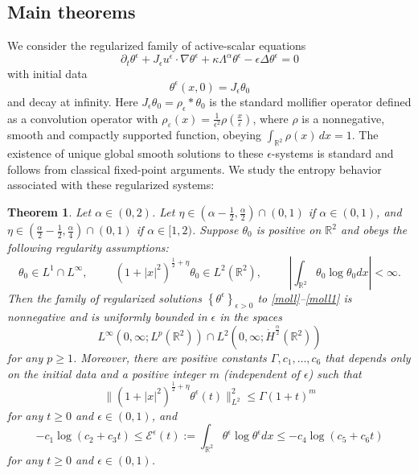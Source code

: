 \documentclass[12pt,reqno]{amsart}
\newcommand{\pa}{\partial}
\newcommand{\na}{\nabla}
\newcommand{\be}{\begin{equation}}
\newcommand{\ee}{\end{equation}}
\newtheorem{thm}{Theorem}[section]
\newcommand{\R}{\mathbb R}
\def\RR{{\mathbb R}}
\begin{document}
\subsection{Main theorems} We consider the regularized family of active-scalar equations 
\be \label{moll}
\pa_t \theta^{\epsilon} + J_{\epsilon}u^{\epsilon} \cdot \na \theta^{\epsilon} + \kappa \Lambda^{\alpha} \theta^{\epsilon} - \epsilon \Delta \theta^{\epsilon} = 0
\ee with initial data
\be \label{moll1}
\theta^{\epsilon}(x,0)  = J_{\epsilon} \theta_0
\ee and decay at infinity. Here $J_{\epsilon}\theta_0 = \rho_\epsilon * \theta_0$ is the standard mollifier operator defined as a convolution operator with $\rho_\varepsilon(x)
=
\frac{1}{\epsilon^2}
\rho\!\left(\frac{x}{\varepsilon}\right)$, where $\rho$ is a nonnegative, smooth and  compactly supported function, obeying $\int_{\mathbb{R}^2} \rho(x)\,dx = 1$. The existence of unique global smooth solutions to these $\epsilon$-systems is standard and follows from classical fixed-point arguments. We study the entropy behavior associated with these regularized systems:



\begin{thm} \label{t1}
Let $\alpha \in (0,2)$. Let $\eta \in \left(\alpha - \frac{1}{2}, \frac{\alpha}{2} \right) \cap (0,1)$ if $\alpha \in (0,1)$, and $\eta \in \left(\frac{\alpha}{2} - \frac{1}{2}, \frac{\alpha}{4} \right) \cap (0,1)$ if $\alpha \in [1,2)$. 
Suppose $\theta_0$ is positive on $\R^2$ and obeys the following regularity assumptions:
\be 
\theta_0 \in L^1 \cap L^{\infty}, \hspace{1cm}  (1+|x|^2)^{\frac{1}{2}+\eta} \theta_0 \in L^2(\R^2), \hspace{1cm} \left|\int_{\R^2} \theta_0 \log \theta_0 dx\right| <\infty.   
\ee Then the family of regularized solutions $\left\{\theta^{\epsilon} \right\}_{\epsilon > 0}$ to \eqref{moll}--\eqref{moll1} is nonnegative and is uniformly bounded in $\epsilon$ in the spaces 
\be 
L^{\infty}(0,\infty; L^p(\RR^2)) \cap L^2(0, \infty; \dot{H}^{\frac{\alpha}{2}}(\R^2))
\ee for any $p \ge 1$. Moreover, there are positive constants $\Gamma, c_1, \dots, c_6$ that depends only on the initial data and a positive integer $m$ (independent of $\epsilon$) such that 
\be 
\|(1+|x|^2)^{\frac{1}{2}+\eta} \theta^{\epsilon}(t)\|_{L^2}^2 \le \Gamma (1+t)^m
\ee for any $t \ge 0$ and $\epsilon \in (0,1)$, and 
\be 
-c_1 \log (c_2+c_3t) \le \mathcal{E}^{\epsilon}(t):= \int_{\R^2} \theta^{\epsilon} \log \theta^{\epsilon} dx \le -c_4 \log (c_5+c_6t)
\ee for any $t \ge 0$ and $\epsilon \in (0,1)$.
\end{thm}
\end{document}
